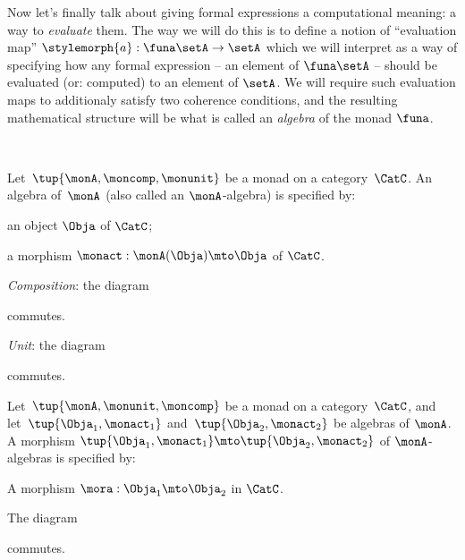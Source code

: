 Now let's finally talk about giving formal expressions a computational meaning: a way to \emph{evaluate} them. The way we will do this is to define a notion of ``evaluation map'' $\stylemorph{a}: \funa \setA \to \setA$ which we will interpret as a way of specifying how any formal expression -- an element of $\funa \setA$ -- should be evaluated (or: computed) to an element of $\setA$. We will require such evaluation maps to additionaly satisfy two coherence conditions, and the resulting mathematical structure will be what is called an \emph{algebra} of the monad $\funa$. 

\


\begin{ctdefinition}
    \label{def:algebramon}
Let~$\tup{\monA, \moncomp, \monunit}$ be a monad on a category~$\CatC$. An algebra of~$\monA$ (also called an $\monA$-algebra) is specified by: \

\constit
\begin{compactenum}
\item an object $\Obja$ of $\CatC$;
\item a morphism $\monact: \monA(\Obja) \mto \Obja$ of $\CatC$.
\end{compactenum}
\condit
\begin{compactenum}
\item \emph{Composition}: the diagram
\begin{center}
  \end{center}
commutes.
\item \emph{Unit}: the diagram 
\begin{center}
  \end{center}
commutes.
\end{compactenum}
\end{ctdefinition}


\begin{ctdefinition}
    \label{def:algebramorphism}
Let~$\tup{\monA, \monunit, \moncomp}$ be a monad on a category~$\CatC$, and let~$\tup{\Obja_1, \monact_1}$ and~$\tup{\Obja_2, \monact_2}$ be algebras of $\monA$. A morphism $\tup{\Obja_1, \monact_1} \mto \tup{\Obja_2, \monact_2}$ of $\monA$-algebras is specified by: \

\constit
\begin{compactenum}
\item A morphism $\mora : \Obja_1 \mto \Obja_2$ in $\CatC$.
\end{compactenum}
\condit
\begin{compactenum}
\item The diagram
\begin{center}
  \end{center}
commutes. 
\end{compactenum}
\end{ctdefinition}


